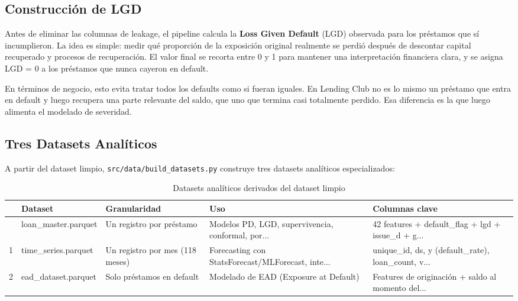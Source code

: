 \documentclass[
  spanish,
  11pt,
  letterpaper,
]{scrbook}
\theoremstyle{plain}
\theoremstyle{remark}
\begin{document}
\subsection{Construcción de LGD}\label{construcciuxf3n-de-lgd}

Antes de eliminar las columnas de leakage, el pipeline calcula la
\textbf{Loss Given Default} (LGD) observada para los préstamos que sí
incumplieron. La idea es simple: medir qué proporción de la exposición
original realmente se perdió después de descontar capital recuperado y
procesos de recuperación. El valor final se recorta entre 0 y 1 para
mantener una interpretación financiera clara, y se asigna LGD = 0 a los
préstamos que nunca cayeron en default.

En términos de negocio, esto evita tratar todos los defaults como si
fueran iguales. En Lending Club no es lo mismo un préstamo que entra en
default y luego recupera una parte relevante del saldo, que uno que
termina casi totalmente perdido. Esa diferencia es la que luego alimenta
el modelado de severidad.

\subsection{Tres Datasets Analíticos}\label{sec-analytical-datasets}

A partir del dataset limpio, \texttt{src/data/build\_datasets.py}
construye tres datasets analíticos especializados:

{

\begin{longtable}[]{@{}lllll@{}}

\caption{\label{tbl-analytical-datasets}Datasets analíticos derivados
del dataset limpio}

\tabularnewline

\toprule\noalign{}
& Dataset & Granularidad & Uso & Columnas clave \\
\midrule\noalign{}
\endhead
\bottomrule\noalign{}
\endlastfoot
0 & loan\_master.parquet & Un registro por préstamo & Modelos PD, LGD,
supervivencia, conformal, por... & 42 features + default\_flag + lgd +
issue\_d + g... \\
1 & time\_series.parquet & Un registro por mes (118 meses) & Forecasting
con StatsForecast/MLForecast, inte... & unique\_id, ds, y
(default\_rate), loan\_count, v... \\
2 & ead\_dataset.parquet & Solo préstamos en default & Modelado de EAD
(Exposure at Default) & Features de originación + saldo al momento
del... \\

\end{longtable}

}
\end{document}
